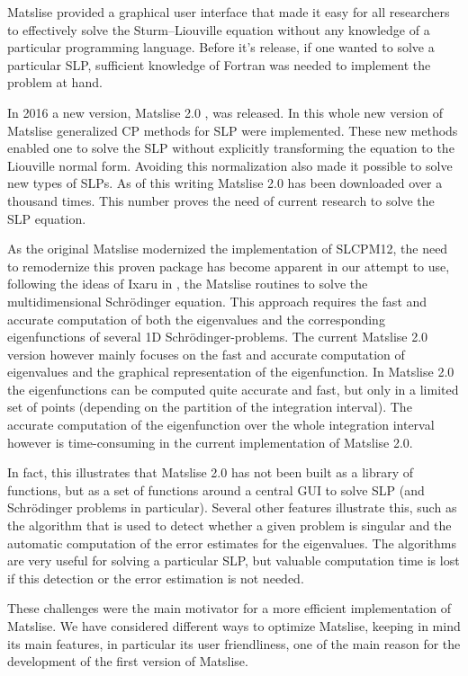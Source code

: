 Matslise provided a graphical user interface that made it easy for all
researchers to effectively solve the
Sturm--Liouville equation without any knowledge of a particular programming language. Before it's release, if one wanted to solve
a particular SLP, sufficient knowledge of Fortran was needed to implement the problem at hand.

In 2016 a new version, Matslise 2.0 \cite{ledoux_matslise_2016}, was
released. In this whole new version of Matslise generalized
CP methods for SLP were implemented. These new methods enabled one to solve the
SLP without explicitly transforming the equation to
the Liouville normal form. Avoiding this normalization also made it possible to solve new types of SLPs. As of this writing
Matslise 2.0 has been downloaded over a thousand times. This number proves the need of current research to solve the SLP
equation.

As the original Matslise modernized the implementation of SLCPM12, the need to remodernize this proven package has become apparent in our attempt to use, following the ideas of Ixaru in \cite{ixaru_new_2010}, the Matslise routines to solve the multidimensional Schrödinger equation.
This approach requires the fast and accurate computation of both the eigenvalues and the corresponding eigenfunctions of several 1D Schrödinger-problems.
The current Matslise 2.0 version however mainly focuses on the fast and accurate computation of eigenvalues and the graphical representation of the eigenfunction.
In Matslise 2.0 the eigenfunctions can be computed quite accurate and fast, but only in a limited set of points (depending on the partition of the integration interval).
The accurate computation of the eigenfunction over the whole integration interval however is time-consuming in the current implementation of Matslise 2.0.

In fact, this illustrates that Matslise 2.0 has not been built as a library of functions, but as a set of functions around a central GUI to solve SLP (and Schrödinger problems in particular).
Several other features illustrate this, such as the algorithm that is used to detect whether a given problem is singular and the automatic computation of the error estimates for the eigenvalues.
The algorithms are very useful for solving a particular SLP, but valuable computation time is lost if this detection or the error estimation is not needed.

These challenges were the main motivator for a more efficient
implementation of Matslise. We have considered different ways to
optimize Matslise, keeping in mind its main features, in particular its user friendliness,
one of the main reason for the development of the first version of Matslise.

